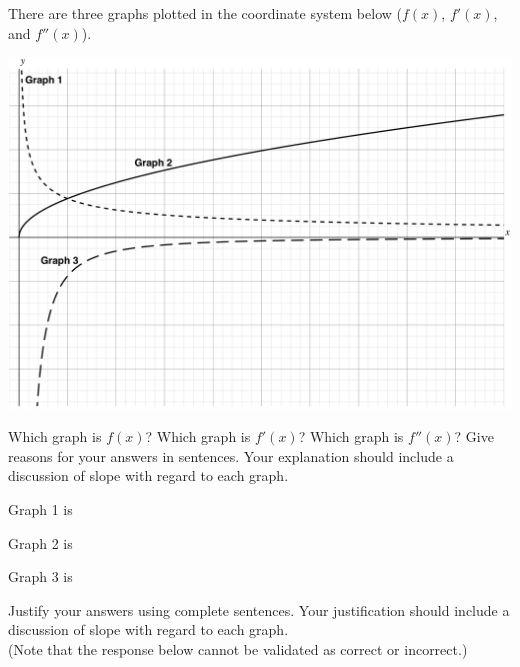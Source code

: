 \documentclass[handout]{ximera}
\begin{document}
\begin{problem}
There are three graphs plotted in the coordinate system below ($f(x)$, $f'(x)$, and $f''(x)$). 


\includegraphics[scale=.06]{SVA-label.png}


Which graph is $f(x)$? Which graph is $f'(x)$? Which graph is $f''(x)$? Give reasons for your answers in sentences. Your explanation should include a discussion of slope with regard to each graph.

\begin{question}
Graph 1 is
\begin{multipleChoice}
\end{multipleChoice}
\end{question}

\begin{question}
Graph 2 is
\begin{multipleChoice}
\end{multipleChoice}
\end{question}

\begin{question}
Graph 3 is
\begin{multipleChoice}
\end{multipleChoice}
\end{question}


Justify your answers using complete sentences. Your justification should include a discussion of slope with regard to each graph. \\  (Note that the response below cannot be validated as correct or incorrect.)
\begin{freeResponse}
\end{freeResponse}
\end{problem}
\end{document}
